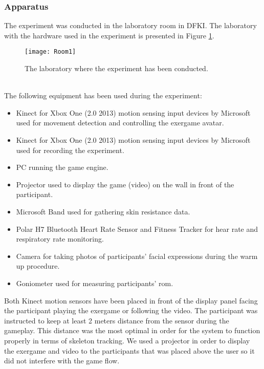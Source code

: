 \subsubsection{Apparatus}
The experiment was conducted in the laboratory room in DFKI. The laboratory with the hardware used in the experiment is presented in Figure \ref{fig:lab1}.\\ 
\begin{figure}[h]
    \centering
    \texttt{[image: Room1]}
    \caption{The laboratory where the experiment has been conducted.}
    \label{fig:lab1}
\end{figure}\\
The following equipment has been used during the experiment:
\begin{itemize}
\item Kinect for Xbox One (2.0 2013) motion sensing input devices by Microsoft used for movement detection and controlling the exergame avatar. 
\item Kinect for Xbox One (2.0 2013) motion sensing input devices by Microsoft used for recording the experiment. 
\item PC running the game engine.
\item Projector used to display the game (video) on the wall in front of the participant.
\item Microsoft Band used for gathering skin resistance data.
\item Polar H7 Bluetooth Heart Rate Sensor and Fitness Tracker for hear rate and respiratory rate monitoring.
\item Camera for taking photos of participants' facial expressions during the warm up procedure.
\item Goniometer used for measuring participants' \acrshort{rom}.
\end{itemize}\pagebreak
Both Kinect motion sensors have been placed in front of the display panel facing the participant playing the exergame or following the video. The participant was instructed to keep at least 2 meters distance from the sensor during the gameplay. This distance was the most optimal in order for the system to function properly in terms of skeleton tracking. %
We used a projector in order to display the exergame and video to the participants that was placed above the user so it did not interfere with the game flow. %
